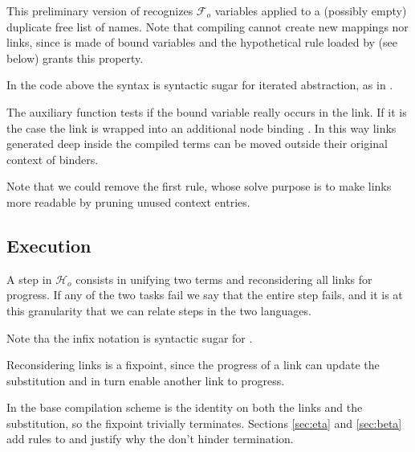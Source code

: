 \documentclass[sigconf,natbib=false,review]{acmart}
\newcommand{\UnifRel}{\ensuremath{\simeq}}
\newcommand{\Ue}{\ensuremath{\UnifRel_\lambda}\xspace}
\newcommand{\Fo}{\ensuremath{\mathcal{F}_{\!o}\xspace}} %
\newcommand{\Ho}{\ensuremath{\mathcal{H}_o}\xspace}
\begin{document}


\noindent
This preliminary version of  recognizes \Fo{} variables
applied to a (possibly empty) duplicate free list of names.
Note that compiling  cannot create new mappings nor links, since 
is made of bound variables and the hypothetical rule loaded by 
(see below) grants this property.



\noindent
In the code above the syntax  is syntactic sugar for
iterated  abstraction, as in .

The auxiliary function  tests if the bound variable
 really occurs in the link. If it is the case the link is wrapped into
an additional  node binding . In this way links generated
deep inside the compiled terms can be moved outside their original context
of binders.



\noindent
Note that we could remove the first rule, whose solve purpose is to make
links more readable by pruning unused context entries.

\subsection{Execution}
\label{sec:execution}

A step in \Ho consists in unifying two terms and reconsidering all
links for progress. If any of the two tasks fail we say that the entire step
fails, and it is at this granularity that we can relate steps in the
two languages.




\noindent
Note tha the infix notation \elpiIn{((A ~\Ue~B) C D)} is syntactic sugar for
\elpiIn{((~\Ue\!\!\!~) A B C D)}.

Reconsidering links is a fixpoint, since the progress of a link can update the
substitution and in turn enable another link to progress.



\noindent
In the base compilation scheme  is the identity
on both the links and the substitution, so the fixpoint trivially terminates.
Sections \ref{sec:eta} and \ref{sec:beta} add rules to 
and justify why the don't hinder termination.
\end{document}
